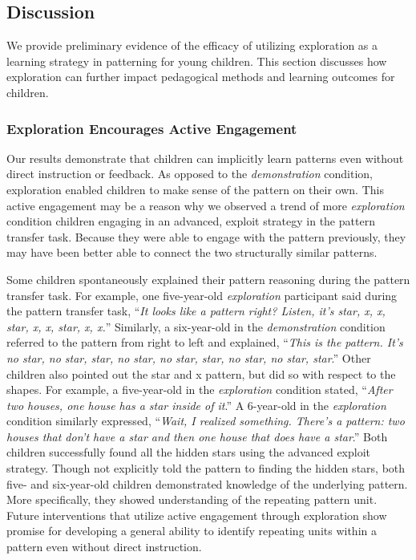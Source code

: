 \subsection{Discussion}
We provide preliminary evidence of the efficacy of utilizing exploration as a learning strategy in patterning for young children. This section discusses how exploration can further impact pedagogical methods and learning outcomes for children.

\subsubsection{Exploration Encourages Active Engagement}
Our results demonstrate that children can implicitly learn patterns even without direct instruction or feedback. As opposed to the \textit{demonstration} condition, exploration enabled children to make sense of the pattern on their own. This active engagement may be a reason why we observed a trend of more \textit{exploration} condition children engaging in an advanced, exploit strategy in the pattern transfer task. Because they were able to engage with the pattern previously, they may have been better able to connect the two structurally similar patterns. 

Some children spontaneously explained their pattern reasoning during the pattern transfer task. For example, one five-year-old \textit{exploration} participant said during the pattern transfer task, ``\textit{It looks like a pattern right? Listen, it’s star, x, x, star, x, x, star, x, x.}'' Similarly, a six-year-old in the \textit{demonstration} condition referred to the pattern from right to left and explained, ``\textit{This is the pattern. It’s no star, no star, star, no star, no star, star, no star, no star, star}.'' Other children also pointed out the star and x pattern, but did so with respect to the shapes. For example, a five-year-old in the \textit{exploration} condition stated, ``\textit{After two houses, one house has a star inside of it}.'' A 6-year-old in the \textit{exploration} condition similarly expressed, “\textit{Wait, I realized something. There’s a pattern: two houses that don’t have a star and then one house that does have a star}.” Both children successfully found all the hidden stars using the advanced exploit strategy. Though not explicitly told the pattern to finding the hidden stars, both five- and six-year-old children demonstrated knowledge of the underlying pattern. More specifically, they showed understanding of the repeating pattern unit. Future interventions that utilize active engagement through exploration show promise for developing a general ability to identify repeating units within a pattern even without direct instruction.

